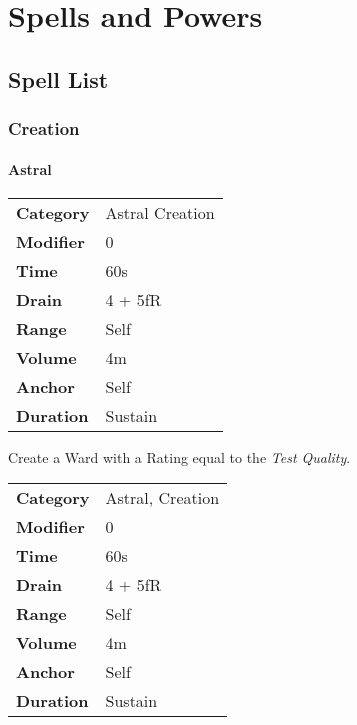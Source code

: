 \chapter{Spells and Powers}

\section{Spell List}

\subsection{Creation}

\subsubsection{Astral}


\begin{tabular}{ll}
    \textbf{Category} & Astral Creation \\
    \textbf{Modifier} & 0               \\
    \textbf{Time}     & 60s             \\
    \textbf{Drain}    & 4 + 5fR         \\
    \textbf{Range}    & Self            \\
    \textbf{Volume}   & 4m              \\
    \textbf{Anchor}   & Self            \\
    \textbf{Duration} & Sustain         \\
\end{tabular}

\hfil

Create a Ward with a Rating equal to the \emph{Test Quality}.


\begin{tabular}{ll}
    \textbf{Category} & Astral, Creation \\
    \textbf{Modifier} & 0                \\
    \textbf{Time}     & 60s              \\
    \textbf{Drain}    & 4 + 5fR          \\
    \textbf{Range}    & Self             \\
    \textbf{Volume}   & 4m               \\
    \textbf{Anchor}   & Self             \\
    \textbf{Duration} & Sustain          \\
\end{tabular}

